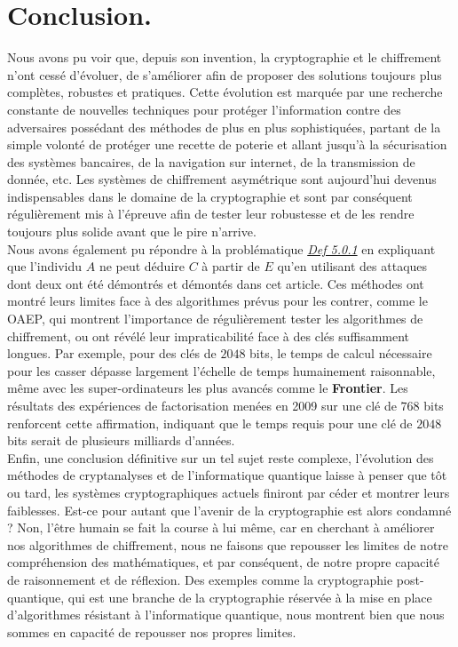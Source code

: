 \documentclass{article}
\begin{document}
\section{Conclusion.}\label{conclusion}

Nous avons pu voir que, depuis son invention, la cryptographie et le
chiffrement n'ont cessé
d'évoluer, de s'améliorer afin de proposer des solutions toujours plus
complètes, robustes et pratiques. Cette évolution est marquée par une
recherche constante de nouvelles techniques pour protéger l'information
contre des adversaires possédant des méthodes de plus en plus sophistiquées, partant de la
simple volonté de protéger une recette de poterie et allant jusqu'à la
sécurisation des systèmes bancaires, de la navigation sur internet, de
la transmission de donnée, etc. Les systèmes de chiffrement asymétrique
sont aujourd'hui devenus indispensables dans le domaine de la
cryptographie et sont par conséquent régulièrement mis à l'épreuve afin
de tester leur robustesse et de les rendre toujours plus solide avant
que le pire n'arrive. \\

Nous avons également pu répondre à la problématique
\textit{\hyperref[def-5.0.1]{Def 5.0.1}} en expliquant que l'individu \(A\)
ne peut déduire \(C\) à partir de \(E\) qu'en utilisant des attaques
dont deux ont été démontrés et démontés dans cet article. Ces méthodes
ont montré leurs limites face à des algorithmes prévus pour les contrer,
comme le OAEP, qui montrent l'importance de régulièrement tester les
algorithmes de chiffrement, ou ont révélé leur impraticabilité face à
des clés suffisamment longues. Par exemple, pour des clés de \(2048\)
bits, le temps de calcul nécessaire pour les casser dépasse largement
l'échelle de temps humainement raisonnable, même avec les
super-ordinateurs les plus avancés comme le \textbf{Frontier}. Les
résultats des expériences de factorisation menées en 2009 sur une clé de
\(768\) bits renforcent cette affirmation, indiquant que le temps requis
pour une clé de \(2048\) bits serait de plusieurs milliards d'années. \\

Enfin, une conclusion définitive sur un tel sujet reste complexe, l'évolution des méthodes de cryptanalyses et de l'informatique quantique laisse à penser que tôt ou tard, les systèmes cryptographiques actuels finiront par céder et montrer leurs faiblesses. Est-ce pour autant que l'avenir de la cryptographie est alors condamné ? Non, l'être humain se fait la course à lui même, car en cherchant à améliorer nos algorithmes de chiffrement, nous ne faisons que repousser les limites de notre compréhension des mathématiques, et par conséquent, de notre propre capacité de raisonnement et de réflexion. Des exemples comme la cryptographie post-quantique, qui est une branche de la cryptographie réservée à la mise en place d'algorithmes résistant à l'informatique quantique, nous montrent bien que nous sommes en capacité de repousser nos propres limites.
\end{document}
